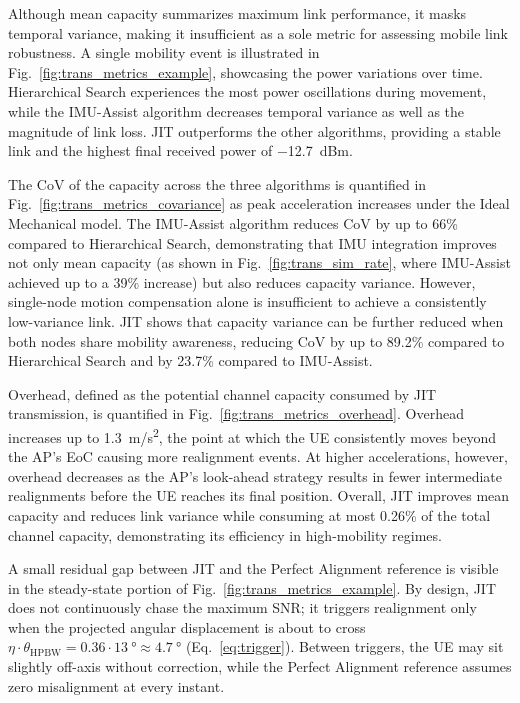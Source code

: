 \documentclass[fleqn,10pt]{wlscirep}
\newcommand{\rev}[1]{{\color{revblue}#1}}
\begin{document}
Although mean capacity summarizes maximum link performance, it masks temporal variance, making it insufficient as a sole metric for assessing mobile link robustness. A single mobility event is illustrated in Fig.~\ref{fig:trans_metrics_example}, showcasing the power variations over time. Hierarchical Search experiences the most power oscillations during movement, while the IMU-Assist algorithm decreases temporal variance as well as the magnitude of link loss. JIT outperforms the other algorithms, providing a stable link and the highest final received power of \SI{-12.7}{dBm}.

The CoV of the capacity across the three algorithms is quantified in Fig.~\ref{fig:trans_metrics_covariance} as peak acceleration increases under the Ideal Mechanical model. The IMU-Assist algorithm reduces CoV by up to 66\% compared to Hierarchical Search, demonstrating that IMU integration improves not only mean capacity (as shown in Fig.~\ref{fig:trans_sim_rate}, where IMU-Assist achieved up to a 39\% increase) but also reduces capacity variance. However, single-node motion compensation alone is insufficient to achieve a consistently low-variance link. JIT shows that capacity variance can be further reduced when both nodes share mobility awareness, reducing CoV by up to 89.2\% compared to Hierarchical Search and by 23.7\% compared to IMU-Assist.

Overhead, defined as the potential channel capacity consumed by JIT transmission, is quantified in Fig.~\ref{fig:trans_metrics_overhead}. Overhead increases up to \SI{1.3}{m/s^2}, the point at which the UE consistently moves beyond the AP's EoC causing more realignment events. At higher accelerations, however, overhead decreases as the AP's look-ahead strategy results in fewer intermediate realignments before the UE reaches its final position. Overall, JIT improves mean capacity and reduces link variance while consuming at most 0.26\% of the total channel capacity, demonstrating its efficiency in high-mobility regimes.

\rev{A small residual gap between JIT and the Perfect Alignment reference is visible in the steady-state portion of Fig.~\ref{fig:trans_metrics_example}. By design, JIT does not continuously chase the maximum SNR; it triggers realignment only when the projected angular displacement is about to cross $\eta \cdot \theta_{\text{HPBW}} = 0.36 \cdot \SI{13}{\degree} \approx \SI{4.7}{\degree}$ (Eq.~\ref{eq:trigger}). Between triggers, the UE may sit slightly off-axis without correction, while the Perfect Alignment reference assumes zero misalignment at every instant.}
\end{document}
